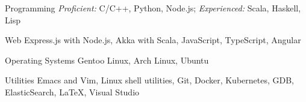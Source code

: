 


\begin{cvskills}


  \cvskill
  {Programming}
  {\textit{Proficient: } C/C++, Python, Node.js; \hspace{0.3cm}
    \textit{Experienced: } Scala, Haskell, Lisp}


  \cvskill
  {Web}
  {Express.js with Node.js, Akka with Scala, JavaScript, TypeScript, Angular}


  \cvskill
  {Operating Systems}
  {Gentoo Linux, Arch Linux, Ubuntu}

  \cvskill
  {Utilities}
  {Emacs and Vim, Linux shell utilities, Git, Docker,
    Kubernetes, GDB, ElasticSearch, \LaTeX, Visual Studio}


\end{cvskills}

